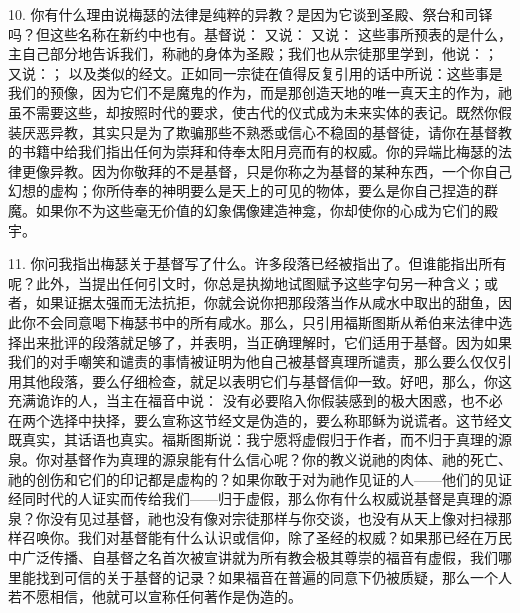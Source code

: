 10. 你有什么理由说梅瑟的法律是纯粹的异教？是因为它谈到圣殿、祭台和司铎吗？但这些名称在新约中也有。基督说： 又说： 又说： 这些事所预表的是什么，主自己部分地告诉我们，称祂的身体为圣殿；我们也从宗徒那里学到，他说：； 又说：； 以及类似的经文。正如同一宗徒在值得反复引用的话中所说：这些事是我们的预像，因为它们不是魔鬼的作为，而是那创造天地的唯一真天主的作为，祂虽不需要这些，却按照时代的要求，使古代的仪式成为未来实体的表记。既然你假装厌恶异教，其实只是为了欺骗那些不熟悉或信心不稳固的基督徒，请你在基督教的书籍中给我们指出任何为崇拜和侍奉太阳月亮而有的权威。你的异端比梅瑟的法律更像异教。因为你敬拜的不是基督，只是你称之为基督的某种东西，一个你自己幻想的虚构；你所侍奉的神明要么是天上的可见的物体，要么是你自己捏造的群魔。如果你不为这些毫无价值的幻象偶像建造神龛，你却使你的心成为它们的殿宇。\newline{}\par

11. 你问我指出梅瑟关于基督写了什么。许多段落已经被指出了。但谁能指出所有呢？此外，当提出任何引文时，你总是执拗地试图赋予这些字句另一种含义；或者，如果证据太强而无法抗拒，你就会说你把那段落当作从咸水中取出的甜鱼，因此你不会同意喝下梅瑟书中的所有咸水。那么，只引用福斯图斯从希伯来法律中选择出来批评的段落就足够了，并表明，当正确理解时，它们适用于基督。因为如果我们的对手嘲笑和谴责的事情被证明为他自己被基督真理所谴责，那么要么仅仅引用其他段落，要么仔细检查，就足以表明它们与基督信仰一致。好吧，那么，你这充满诡诈的人，当主在福音中说： 没有必要陷入你假装感到的极大困惑，也不必在两个选择中抉择，要么宣称这节经文是伪造的，要么称耶稣为说谎者。这节经文既真实，其话语也真实。福斯图斯说：我宁愿将虚假归于作者，而不归于真理的源泉。你对基督作为真理的源泉能有什么信心呢？你的教义说祂的肉体、祂的死亡、祂的创伤和它们的印记都是虚构的？如果你敢于对为祂作见证的人——他们的见证经同时代的人证实而传给我们——归于虚假，那么你有什么权威说基督是真理的源泉？你没有见过基督，祂也没有像对宗徒那样与你交谈，也没有从天上像对扫禄那样召唤你。我们对基督能有什么认识或信仰，除了圣经的权威？如果那已经在万民中广泛传播、自基督之名首次被宣讲就为所有教会极其尊崇的福音有虚假，我们哪里能找到可信的关于基督的记录？如果福音在普遍的同意下仍被质疑，那么一个人若不愿相信，他就可以宣称任何著作是伪造的。\newline{}\par


